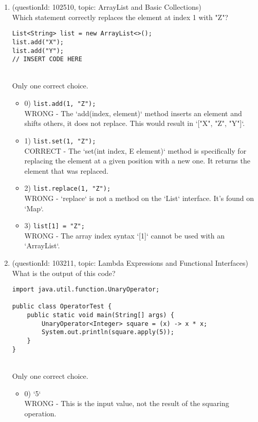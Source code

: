 \documentclass[12pt]{article}
\begin{document}
\begin{enumerate}[label=(\arabic*)]
\begin{itemize}
\end{itemize}
\item (questionId: 102510, topic: ArrayList and Basic Collections) \\ 
Which statement correctly replaces the element at index 1 with "Z"?\begin{verbatim}
List<String> list = new ArrayList<>();
list.add("X");
list.add("Y");
// INSERT CODE HERE
\end{verbatim}
\\ \noindent Only one correct choice. 
\begin{itemize}
\item 0) \verb|list.add(1, "Z");|
 \\ 
WRONG - The `add(index, element)` method inserts an element and shifts others, it does not replace. This would result in `["X", "Z", "Y"]`.

\item 1) \verb|list.set(1, "Z");|
 \\ 
CORRECT - The `set(int index, E element)` method is specifically for replacing the element at a given position with a new one. It returns the element that was replaced.

\item 2) \verb|list.replace(1, "Z");|
 \\ 
WRONG - `replace` is not a method on the `List` interface. It's found on `Map`.

\item 3) \verb|list[1] = "Z";|
 \\ 
WRONG - The array index syntax `[1]` cannot be used with an `ArrayList`.

\end{itemize}
\item (questionId: 103211, topic: Lambda Expressions and Functional Interfaces) \\ 
What is the output of this code?
\begin{verbatim}
import java.util.function.UnaryOperator;

public class OperatorTest {
    public static void main(String[] args) {
        UnaryOperator<Integer> square = (x) -> x * x;
        System.out.println(square.apply(5));
    }
}
\end{verbatim}
\\ \noindent Only one correct choice. 
\begin{itemize}
\item 0) `5`
 \\ 
WRONG - This is the input value, not the result of the squaring operation.


\end{itemize}
\end{enumerate}
\end{document}
